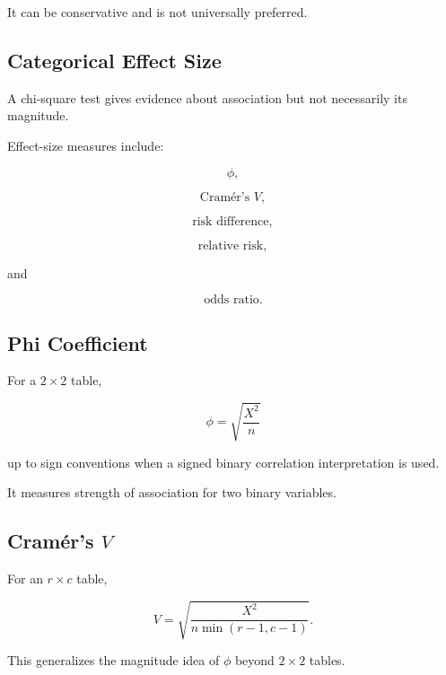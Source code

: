 It can be conservative and is not universally preferred.

\subsection{Categorical Effect Size}
\label{subsec:categorical-effect-size}

A chi-square test gives evidence about association but not necessarily
its magnitude.

Effect-size measures include:

\[
\boxed{
\phi,
}
\]

\[
\boxed{
\text{Cramér's }V,
}
\]

\[
\boxed{
\text{risk difference},
}
\]

\[
\boxed{
\text{relative risk},
}
\]

and

\[
\boxed{
\text{odds ratio}.
}
\]

\subsection{Phi Coefficient}
\label{subsec:phi-coefficient}

For a \(2\times2\) table,

\[
\boxed{
\phi
=
\sqrt{
\frac{
X^2
}{
n
}
}
}
\]

up to sign conventions when a signed binary correlation interpretation
is used.

It measures strength of association for two binary variables.

\subsection{Cramér's \(V\)}
\label{subsec:cramers-v}

For an \(r\times c\) table,

\[
\boxed{
V
=
\sqrt{
\frac{
X^2
}{
n
\min(r-1,c-1)
}
}.
}
\]

This generalizes the magnitude idea of \(\phi\) beyond \(2\times2\)
tables.

